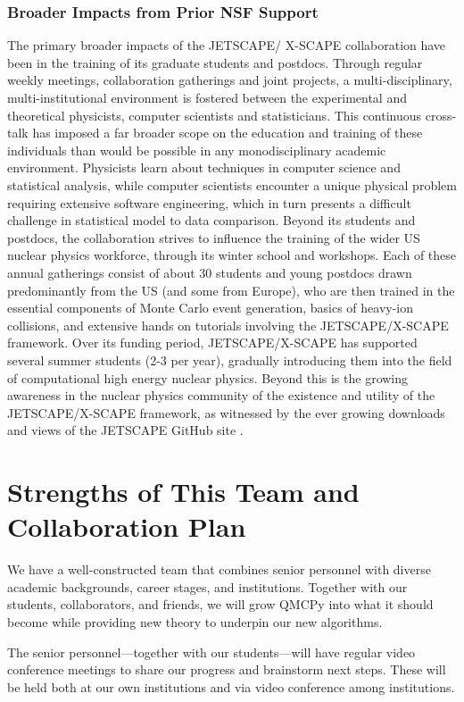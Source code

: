 \documentclass[11pt]{NSFamsart}
\begin{document}
\subsubsection{Broader Impacts from Prior NSF Support}
The primary broader impacts of the JETSCAPE/ X-SCAPE collaboration have been in the training of its graduate students and postdocs. Through regular weekly meetings, collaboration gatherings and joint projects, a multi-disciplinary, multi-institutional environment is fostered between the experimental and theoretical physicists, computer scientists and statisticians. This continuous cross-talk has imposed a far broader scope on the education and training of these individuals than would be possible in any monodisciplinary academic environment. Physicists learn about techniques in computer science and statistical analysis, while computer scientists encounter a unique physical problem requiring extensive software engineering, which in turn presents a difficult challenge in statistical model to data comparison. Beyond its students and postdocs, the collaboration strives to influence the training of the wider US nuclear physics workforce, through its winter school and workshops. Each of these annual gatherings consist of about 30 students and young postdocs drawn predominantly from the US (and some from Europe), who are then trained in the essential components of Monte Carlo event generation, basics of heavy-ion collisions, and extensive hands on tutorials involving the JETSCAPE/X-SCAPE framework. Over its funding period, JETSCAPE/X-SCAPE has supported several summer students (2-3 per year), gradually introducing them into the field of computational high energy nuclear physics. Beyond this is the growing awareness in the nuclear physics community of the existence and utility of the JETSCAPE/X-SCAPE framework, as witnessed by the ever growing downloads and views of the JETSCAPE GitHub site \cite{jetscape}.

\section{Strengths of This Team and Collaboration Plan}
We have a well-constructed  team that combines senior personnel with diverse academic backgrounds, career stages, and institutions.  Together with our students, collaborators, and friends, we will grow QMCPy into what it should become while providing new theory to underpin our new algorithms.

The senior personnel---together with our students---will have regular video conference meetings to share our progress and brainstorm next steps. These will be held both at our own institutions and via video conference among institutions.
\end{document}
